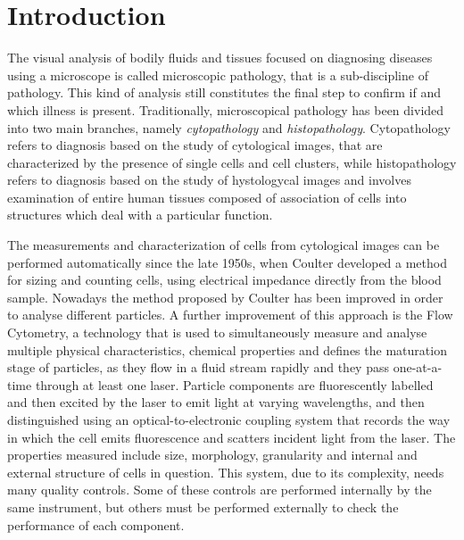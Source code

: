 \documentclass[final,a4paper,12pt,english]{UnicaPhdThesis3}
\begin{document}
	\tableofcontents
	
	\listoffigures 
	
	\listoftables
	
	\newpage
	\printacronyms[include-classes=abbrev, name=Acronyms]
	
	\chapter{Introduction} %
	The visual analysis of bodily fluids and tissues focused on diagnosing diseases using a microscope is called microscopic pathology, that is a sub-discipline of pathology. This kind of analysis still constitutes the final step to confirm if and which illness is present. Traditionally, microscopical pathology has been divided into two main branches, namely \textit{cytopathology} and \textit{histopathology}. Cytopathology refers to diagnosis based on the study of cytological images, that are characterized by the presence of single cells and cell clusters, while histopathology refers to diagnosis based on the study of hystologycal images and involves examination of entire human tissues composed of association of cells into structures which deal with a particular function.
	
	The measurements and characterization of cells from cytological images can be performed automatically since the late 1950s, when Coulter \cite{Coulter} developed a method for sizing and counting cells, using electrical impedance directly from the blood sample. Nowadays the method proposed by Coulter has been improved in order to analyse different particles. A further improvement of this approach is the Flow Cytometry, a technology that is used to simultaneously measure and analyse multiple physical characteristics, chemical properties and defines the maturation stage of particles, as they flow in a fluid stream rapidly and they pass one-at-a-time through at least one laser. Particle components are fluorescently labelled and then excited by the laser to emit light at varying wavelengths, and then distinguished using an optical-to-electronic coupling system that records the way in which the cell emits fluorescence and scatters incident light from the laser. The properties measured include size, morphology, granularity and internal and external structure of cells in question. This system, due to its complexity, needs many quality controls. Some of these controls are performed internally by the same instrument, but others must be performed externally to check the performance of each component.
	
\end{document}
